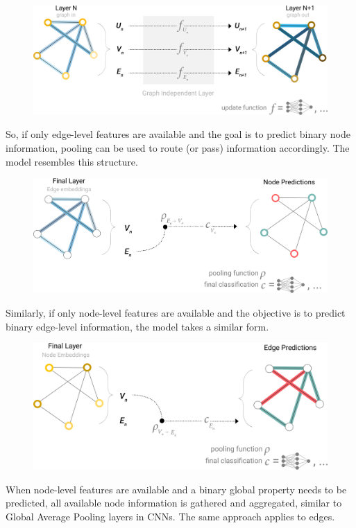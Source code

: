 \begin{figure}[H]
  \centering
  \includegraphics[width=0.7\linewidth]{chap2/3.png}
  \label{fig:usecase}
\end{figure}

So, if only edge-level features are available and the goal is to predict binary node information, pooling can be used to route (or pass) information accordingly. The model resembles this structure.

\begin{figure}[H]
  \centering
  \includegraphics[width=0.7\linewidth]{chap2/4.png}
  \label{fig:usecase}
\end{figure}

Similarly, if only node-level features are available and the objective is to predict binary edge-level information, the model takes a similar form.

\begin{figure}[H]
  \centering
  \includegraphics[width=0.7\linewidth]{chap2/5.png}
  \label{fig:usecase}
\end{figure}

When node-level features are available and a binary global property needs to be predicted, all available node information is gathered and aggregated, similar to Global Average Pooling layers in CNNs. The same approach applies to edges.



